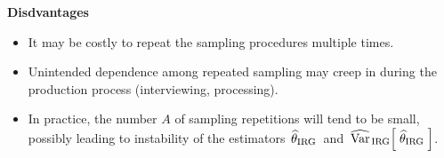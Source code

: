 \vskip 0.5cm
\noindent
\textbf{Disdvantages}
\begin{itemize}
\item
	It may be costly to repeat the sampling procedures multiple times.
\item
	Unintended dependence among repeated sampling may creep in during the production process
	(interviewing, processing).
\item
	In practice, the number $A$ of sampling repetitions will tend to be small,
	possibly leading to instability of the estimators
	\,$\widehat{\theta}_{\textnormal{IRG}}$\,
	and
	\,$\widehat{\textnormal{Var}}_{\,\textnormal{IRG}}\!\left[\;\widehat{\theta}_{\textnormal{IRG}}\;\right]$.
\end{itemize}

